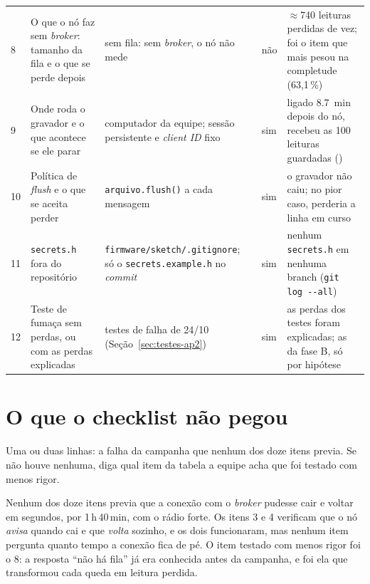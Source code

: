 \begin{table}[H]
\begin{tabular}{@{}C{0.5cm}L{4.4cm}L{4.4cm}C{1.0cm}L{4.1cm}@{}}
8  & O que o nó faz sem \emph{broker}: tamanho da fila e o que se perde depois & sem fila: sem \emph{broker}, o nó não mede & não & $\approx$740 leituras perdidas de vez; foi o item que mais pesou na completude (63,1\,\%) \\
9  & Onde roda o gravador e o que acontece se ele parar & computador da equipe; sessão persistente e \emph{client ID} fixo & sim & ligado \SI{8,7}{\minute} depois do nó, recebeu as 100 leituras guardadas () \\
10 & Política de \emph{flush} e o que se aceita perder & \texttt{arquivo.flush()} a cada mensagem & sim & o gravador não caiu; no pior caso, perderia a linha em curso \\
11 & \texttt{secrets.h} fora do repositório & \texttt{firmware/sketch/.gitignore}; só o \texttt{secrets.example.h} no \emph{commit} & sim & nenhum \texttt{secrets.h} em nenhuma branch (\texttt{git log -{}-all}) \\
12 & Teste de fumaça sem perdas, ou com as perdas explicadas & testes de falha de 24/10 (Seção~\ref{sec:testes-ap2}) & sim & as perdas dos testes foram explicadas; as da fase B, só por hipótese \\
\bottomrule
\end{tabular}
\end{table}

\section*{O que o checklist não pegou}
{}

\begin{orientacao}
Uma ou duas linhas: a falha da campanha que nenhum dos doze itens
previa. Se não houve nenhuma, diga qual item da tabela a equipe acha que
foi testado com menos rigor.
\end{orientacao}

Nenhum dos doze itens previa que a conexão com o \emph{broker} pudesse
cair e voltar em segundos, por 1\,h\,40\,min, com o rádio forte. Os
itens 3 e 4 verificam que o nó \emph{avisa} quando cai e que
\emph{volta} sozinho, e os dois funcionaram, mas nenhum item pergunta
quanto tempo a conexão fica de pé. O item testado com menos rigor foi o
8: a resposta \enquote{não há fila} já era conhecida antes da campanha,
e foi ela que transformou cada queda em leitura perdida.
